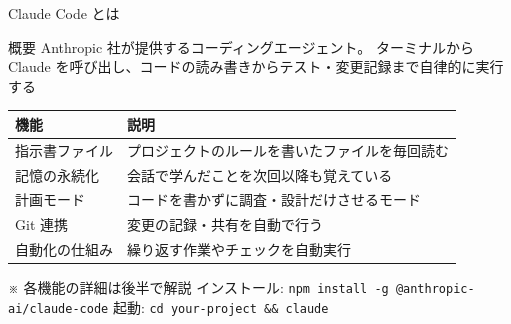 \documentclass[aspectratio=169, 14pt]{beamer}
\begin{document}
\begin{frame}{Claude Code とは}
  \begin{block}{概要}
    {\small Anthropic 社が提供するコーディングエージェント。
    ターミナルから Claude を呼び出し、コードの読み書きからテスト・変更記録まで自律的に実行する}
  \end{block}

  \begin{table}
    \centering\small
    \begin{tabular}{ll}
      \hline
      \textbf{機能} & \textbf{説明} \\
      \hline
      指示書ファイル    & プロジェクトのルールを書いたファイルを毎回読む \\
      記憶の永続化      & 会話で学んだことを次回以降も覚えている \\
      計画モード        & コードを書かずに調査・設計だけさせるモード \\
      Git 連携          & 変更の記録・共有を自動で行う \\
      自動化の仕組み    & 繰り返す作業やチェックを自動実行 \\
      \hline
    \end{tabular}
  \end{table}

  {\scriptsize
    ※ 各機能の詳細は後半で解説 \quad
    インストール: \texttt{npm install -g @anthropic-ai/claude-code} \quad
    起動: \texttt{cd your-project \&\& claude}
  }
\end{frame}

\end{document}
